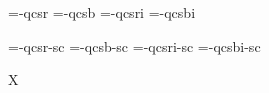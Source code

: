 

\ifx\sizespec\undefined \def\sizespec{}\fi
\ifx\font\corkencoded {}\else {}\fi

\ifx\font\unicoded  {} 
\else

\font\tenrm=\tmp-qcsr  \sizespec
\font\tenbf=\tmp-qcsb  \sizespec
\font\tenit=\tmp-qcsri \sizespec
\font\tenbi=\tmp-qcsbi \sizespec

\font\tenrmc=\tmp-qcsr-sc  \sizespec
\font\tenbfc=\tmp-qcsb-sc  \sizespec
\font\tenitc=\tmp-qcsri-sc \sizespec
\font\tenbic=\tmp-qcsbi-sc \sizespec

\fi

\tenrm

\ifx\regfontdefault\undefined \else
   \regfontdefault
   \regfont\tenrmc \regfont\tenitc
   \regfont\tenbfc \regfont\tenbic
\fi

\def\caps#1{{\escapechar=-1 \expandafter}%
  \expandafter\csname\expandafter\tenonlytext\string#1c\endcsname}
\def\tenonlytext{ten}

\ifx\font\corkencoded\else \ifx\font\unicoded\else  \fi\fi
\ifx\mathpreloaded X\else  \fi                     


